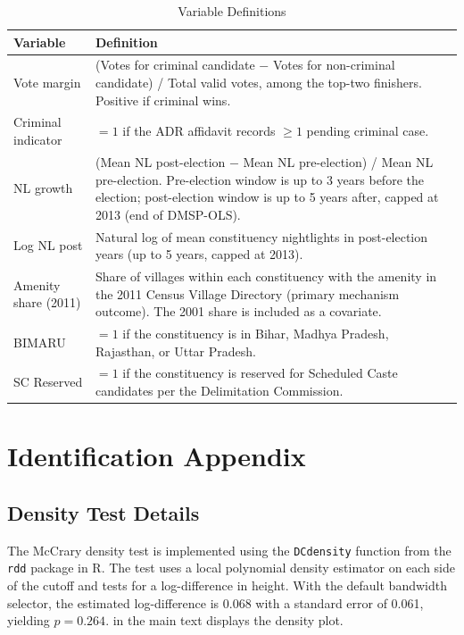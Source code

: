 \documentclass[12pt]{article}
\begin{document}
\begin{table}[H]
\centering
\caption{Variable Definitions}
\label{tab:variables}
\begin{threeparttable}
\begin{tabular}{p{4cm}p{10cm}}
\toprule
Variable & Definition \\
\midrule
Vote margin & (Votes for criminal candidate $-$ Votes for non-criminal candidate) / Total valid votes, among the top-two finishers. Positive if criminal wins. \\[3pt]
Criminal indicator & $= 1$ if the ADR affidavit records $\geq 1$ pending criminal case. \\[3pt]
NL growth & (Mean NL post-election $-$ Mean NL pre-election) / Mean NL pre-election. Pre-election window is up to 3 years before the election; post-election window is up to 5 years after, capped at 2013 (end of DMSP-OLS). \\[3pt]
Log NL post & Natural log of mean constituency nightlights in post-election years (up to 5 years, capped at 2013). \\[3pt]
Amenity share (2011) & Share of villages within each constituency with the amenity in the 2011 Census Village Directory (primary mechanism outcome). The 2001 share is included as a covariate. \\[3pt]
BIMARU & $= 1$ if the constituency is in Bihar, Madhya Pradesh, Rajasthan, or Uttar Pradesh. \\[3pt]
SC Reserved & $= 1$ if the constituency is reserved for Scheduled Caste candidates per the Delimitation Commission. \\
\bottomrule
\end{tabular}
\end{threeparttable}
\end{table}


\section{Identification Appendix}
\label{app:identification}

\subsection{Density Test Details}

The McCrary density test is implemented using the \texttt{DCdensity} function from the \texttt{rdd} package in R. The test uses a local polynomial density estimator on each side of the cutoff and tests for a log-difference in height. With the default bandwidth selector, the estimated log-difference is 0.068 with a standard error of 0.061, yielding $p = 0.264$.  in the main text displays the density plot.
\end{document}
